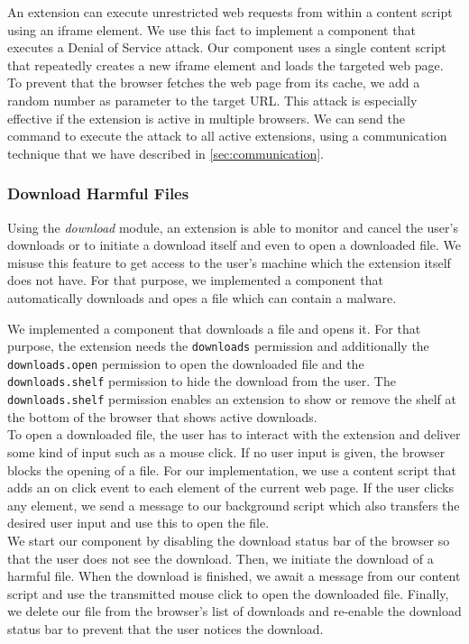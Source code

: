 	An extension can execute unrestricted web requests from within a content script using an iframe element. We use this fact to implement a component that executes a Denial of Service attack. Our component uses a single content script that repeatedly creates a new iframe element and loads the targeted web page. To prevent that the browser fetches the web page from its cache, we add a random number as parameter to the target URL. This attack is especially effective if the extension is active in multiple browsers. We can send the command to execute the attack to all active extensions, using a communication technique that we have described in \autoref{sec:communication}.

\subsubsection{Download Harmful Files}
\label{sec:downloads}

	Using the \textit{download} module, an extension is able to monitor and cancel the user's downloads or to initiate a download itself and even to open a downloaded file. We misuse this feature to get access to the user's machine which the extension itself does not have. For that purpose, we implemented a component that automatically downloads and opes a file which can contain a malware.
	
	We implemented a component that downloads a file and opens it. For that purpose, the extension needs the \texttt{downloads} permission and additionally the \texttt{downloads.open} permission to open the downloaded file and the \texttt{downloads.shelf} permission to hide the download from the user. The \texttt{downloads.shelf} permission enables an extension to show or remove the shelf at the bottom of the browser that shows active downloads. \\
	To open a downloaded file, the user has to interact with the extension and deliver some kind of input such as a mouse click. If no user input is given, the browser blocks the opening of a file. For our implementation, we use a content script that adds an on click event to each element of the current web page. If the user clicks any element, we send a message to our background script which also transfers the desired user input and use this to open the file. \\
	We start our component by disabling the download status bar of the browser so that the user does not see the download. Then, we initiate the download of a harmful file. When the download is finished, we await a message from our content script and use the transmitted mouse click to open the downloaded file. Finally, we delete our file from the browser's list of downloads and re-enable the download status bar to prevent that the user notices the download.
	
